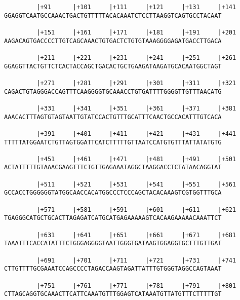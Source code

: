 \documentclass{article}
\begin{document}
\begin{Verbatim}
         |+91      |+101     |+111     |+121     |+131     |+141
GGAGGTCAATGCCAAACTGACTGTTTTTACACAAATCTCCTTAAGGTCAGTGCCTACAAT
                                                            
         |+151     |+161     |+171     |+181     |+191     |+201
AAGACAGTGACCCCTTGTCAGCAAACTGTGACTCTGTGTAAAGGGGAGATGACCTTGACA
                                                            
         |+211     |+221     |+231     |+241     |+251     |+261
GGAGGTTACTGTTCTCACTACCAGCTGACACTGCTGAAGATAAGATGCACAATGGCTAGT
                                                            
         |+271     |+281     |+291     |+301     |+311     |+321
CAGACTGTAGGGACCAGTTTCAAGGGGTGCAAACCTGTGATTTTGGGGTTGTTTAACATG
                                                            
         |+331     |+341     |+351     |+361     |+371     |+381
AAACACTTTAGTGTAGTAATTGTATCCACTGTTTGCATTTCAACTGCCACATTTGTCACA
                                                            
         |+391     |+401     |+411     |+421     |+431     |+441
TTTTTATGGAATCTGTTAGTGGATTCATCTTTTTGTTAATCCATGTGTTTATTATATGTG
                                                            
         |+451     |+461     |+471     |+481     |+491     |+501
ACTATTTTTGTAAACGAAGTTTCTGTTGAGAAATAGGCTAAGGACCTCTATAACAGGTAT
                                                            
         |+511     |+521     |+531     |+541     |+551     |+561
GCCACCTGGGGGGTATGGCAACCACATGGCCCTCCCAGCTACACAAAGTCGTGGTTTGCA
                                                            
         |+571     |+581     |+591     |+601     |+611     |+621
TGAGGGCATGCTGCACTTAGAGATCATGCATGAGAAAAAGTCACAAGAAAAACAAATTCT
                                                            
         |+631     |+641     |+651     |+661     |+671     |+681
TAAATTTCACCATATTTCTGGGAGGGGTAATTGGGTGATAAGTGGAGGTGCTTTGTTGAT
                                                            
         |+691     |+701     |+711     |+721     |+731     |+741
CTTGTTTTGCGAAATCCAGCCCCTAGACCAAGTAGATTATTTGTGGGTAGGCCAGTAAAT
                                                            
         |+751     |+761     |+771     |+781     |+791     |+801
CTTAGCAGGTGCAAACTTCATTCAAATGTTTGGAGTCATAAATGTTATGTTTCTTTTTGT
                                                            

\end{Verbatim}
\end{document}
